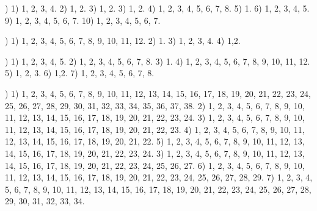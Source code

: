 \documentclass[a4paper,11pt]{article}
\begin{document}
\vspace{\spaceFour}



\noindent
{}) 1) 1, 2, 3, 4. 2) 1, 2. 3) 1, 2. 3) 1, 2. 4) 1, 2, 3, 4,
5, 6, 7, 8. 5) 1. 6) 1, 2, 3, 4, 5. 9) 1, 2, 3, 4, 5, 6, 7.
10) 1, 2, 3, 4, 5, 6, 7.

\vspace{\spaceFour}



\noindent
{}) 1) 1, 2, 3, 4, 5, 6, 7, 8, 9, 10, 11, 12. 2) 1. 3) 1, 2,
3, 4. 4) 1,2.

\vspace{\spaceFour}



\noindent
{}) 1) 1, 2, 3, 4, 5. 2) 1, 2, 3, 4, 5, 6, 7, 8. 3) 1.
4) 1, 2, 3, 4, 5, 6, 7, 8, 9, 10, 11, 12. 5) 1, 2, 3. 6) 1,2.
7) 1, 2, 3, 4, 5, 6, 7, 8.


\vspace{\spaceTwo}











\noindent
{}) 1) 1, 2, 3, 4, 5, 6, 7, 8, 9, 10, 11, 12, 13, 14, 15,
16, 17, 18, 19, 20, 21, 22, 23, 24, 25, 26, 27, 28, 29, 30, 31, 32,
33, 34, 35, 36, 37, 38. 2) 1, 2, 3, 4, 5, 6, 7, 8, 9, 10, 11, 12, 13,
14, 15, 16, 17, 18, 19, 20, 21, 22, 23, 24. 3) 1, 2, 3, 4, 5, 6, 7, 8,
9, 10, 11, 12, 13, 14, 15, 16, 17, 18, 19, 20, 21, 22, 23. 4) 1, 2, 3,
4, 5, 6, 7, 8, 9, 10, 11, 12, 13, 14, 15, 16, 17, 18, 19, 20, 21, 22.
5) 1, 2, 3, 4, 5, 6, 7, 8, 9, 10, 11, 12, 13, 14, 15, 16, 17, 18, 19,
20, 21, 22, 23, 24. 3) 1, 2, 3, 4, 5, 6, 7, 8, 9, 10, 11, 12, 13, 14,
15, 16, 17, 18, 19, 20, 21, 22, 23, 24, 25, 26, 27. 6) 1, 2, 3, 4, 5,
6, 7, 8, 9, 10, 11, 12, 13, 14, 15, 16, 17, 18, 19, 20, 21, 22, 23, 24,
25, 26, 27, 28, 29. 7) 1, 2, 3, 4, 5, 6, 7, 8, 9, 10, 11, 12, 13, 14,
15, 16, 17, 18, 19, 20, 21, 22, 23, 24, 25, 26, 27, 28, 29, 30, 31, 32,
33, 34.

\vspace{\spaceFour}
\end{document}

